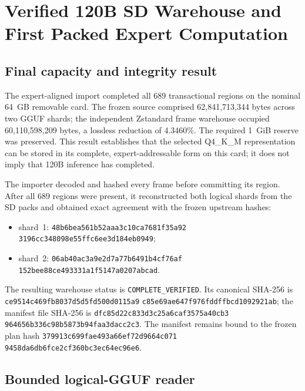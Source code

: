 \begingroup
\sloppy
\section{Verified 120B SD Warehouse and First Packed Expert Computation}
\label{sec:gptoss120b-verified-storage-first-compute}

\subsection{Final capacity and integrity result}

The expert-aligned import completed all 689 transactional regions on the
nominal 64~GB removable card.  The frozen source comprised
62,841,713,344 bytes across two GGUF shards; the independent Zstandard frame
warehouse occupied 60,110,598,209 bytes, a lossless reduction of
4.3460\%.  The required 1~GiB reserve was preserved.  This result establishes
that the selected Q4\_K\_M representation can be stored in its complete,
expert-addressable form on this card; it does not imply that 120B inference
has completed.

The importer decoded and hashed every frame before committing its region.
After all 689 regions were present, it reconstructed both logical shards from
the SD packs and obtained exact agreement with the frozen upstream hashes:
\begin{itemize}
  \item shard~1: \texttt{48b6bea561b52aaa3c10ca7681f35a92}%
  \allowbreak\texttt{3196cc348098e55ffc6ee3d184eb0949};
  \item shard~2: \texttt{06ab40ac3a9e2d7a77b6491b4cf76af}%
  \allowbreak\texttt{152bee88ce493331a1f5147a0207abcad}.
\end{itemize}
The resulting warehouse status is \texttt{COMPLETE\_VERIFIED}.  Its canonical
SHA-256 is
\texttt{ce9514c469fb8037d5d5fd500d0115a9}%
\allowbreak\texttt{c85e69ae647f976fddffbcd1092921ab}; the manifest file SHA-256 is
\texttt{dfc85d22c833d3c25a6caf3575a40cb3}%
\allowbreak\texttt{964656b336c98b5873b94faa3dacc2c3}.  The manifest remains bound to
the frozen plan hash
\texttt{379913c699fae493a66ef72d9664c071}%
\allowbreak\texttt{9458da6db6fce2cf360bc3ec64ec96e6}.

\subsection{Bounded logical-GGUF reader}

